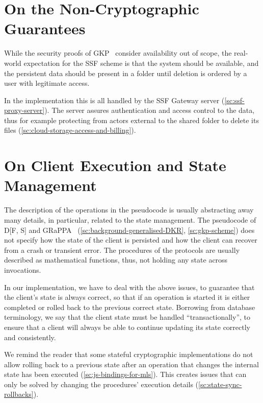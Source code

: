 \section{On the Non-Cryptographic Guarantees}\label{sc:gap-non-crypto-guarantees}

While the security proofs of GKP~\cite{GKP} consider availability out of
scope, the real-world expectation for the SSF scheme
is that the system should be
available, and the persistent data should be present in 
a folder until deletion is ordered by a user with
legitimate access.

In the implementation this is all handled by the SSF Gateway server
(\cref{sc:ssf-proxy-server}).
The server assures authentication and access control
to the data, thus for example protecting from actors 
external to the shared folder to delete its files (\cref{sc:cloud-storage-access-and-billing}). 

\section{On Client Execution and State Management}\label{sc:gap-execution-multi-tenancy-state-management}

The description of the operations in the pseudocode is usually abstracting away many details,
in particular, related to the state management.
The pseudocode of D[F, S] and GRaPPA~\cite{GKP} (\cref{sc:background-generalised-DKR}, \cref{sc:gkp-scheme}) 
does not specify how the state of the client is persisted 
and how the client can recover from a crash or transient error.
The procedures of the protocols are usually described as
mathematical functions, thus, not holding any state across
invocations.

In our implementation, we have to deal with the above issues,
to guarantee that the client's state is always correct,
so that if an operation is started it is either completed
or rolled back to the previous correct state.
Borrowing from database terminology, we say that the client
state must be handled ``transactionally'', to ensure that
a client will always be able to continue updating its state
correctly and consistently.

We remind the reader that some stateful cryptographic implementations do not
allow rolling back to a previous state after an operation
that changes the internal state has been executed (\cref{sc:js-bindings-for-mls}).
This creates issues that can only be solved by changing
the procedures' execution details (\cref{sc:state-sync-rollbacks}).

